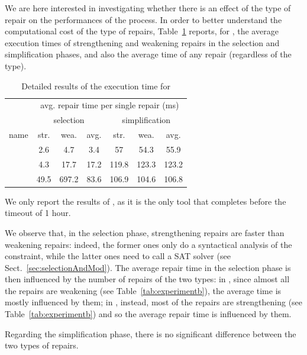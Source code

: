 \begin{tikzborder}{\cite{Gargantini16:validation}}
\begin{tikzborder}{\cite{gargantini_combinatorial_2017}}
\begin{tikzborder}{\cite{gargantini_combinatorial_2017}}
\begin{tikzborder}{\cite{garn2019}}
\begin{tikzborder}{\cite{arcaini2019achieving}}
\begin{tikzborder}{\cite{arcaini2019varivolution}}
		We are here interested in investigating whether there is an effect of the type of repair on the performances of the process. In order to better understand the computational cost of the type of repairs, Table~\ref{tab:experimentc} reports, for \benchReal, the average execution times of strengthening and weakening repairs in the selection and simplification phases, and also the average time of any repair (regardless of the type).\be
		\begin{table}[!hbt]
			\centering%
			\caption{Detailed results of the execution time for \benchReal}
			\label{tab:experimentc}
			\begin{tabular}{c|ccc|ccc}
				\toprule
				& \multicolumn{6}{c}{avg. repair time per single repair (ms)}\\
				& \multicolumn{3}{c|}{selection} & \multicolumn{3}{c}{simplification}\\
				name & str. & wea. & avg. & str. & wea. & avg.\\
				\midrule
				\rhiscom & 2.6 & 4.7 & 3.4 & 57 & 54.3 & 55.9\\
				\erpSpl & 4.3 & 17.7 & 17.2 & 119.8 & 123.3 & 123.2\\
				\windows & 49.5 & 697.2 & 83.6 & 106.9 & 104.6 & 106.8\\
				\bottomrule
			\end{tabular}
		\end{table}
		
		\bb We only report the results of \espresso, as it is the only tool that completes before the timeout of 1 hour.
		
		We observe that, in the selection phase, strengthening repairs are faster than weakening repairs: indeed, the former ones only do a syntactical analysis of the constraint, while the latter ones need to call a SAT solver (see Sect.~\ref{sec:selectionAndMod}). The average repair time in the selection phase is then influenced by the number of repairs of the two types: in \erpSpl, since almost all the repairs are weakening (see Table~\ref{tab:experimentb}), the average time is mostly influenced by them; in \windows, instead, most of the repairs are strengthening (see Table~\ref{tab:experimentb}) and so the average repair time is influenced by them.
		
		Regarding the simplification phase, there is no significant difference between the two types of repairs.\be 
		

\end{tikzborder}
\end{tikzborder}
\end{tikzborder}
\end{tikzborder}
\end{tikzborder}
\end{tikzborder}
